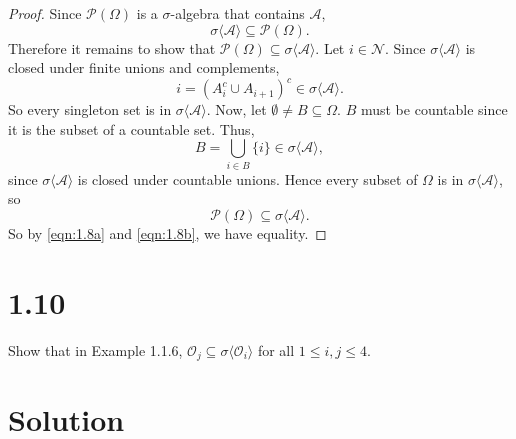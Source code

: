 \documentclass[12pt]{article}
\begin{document}
\begin{proof}
Since $\mathcal{P}(\Omega)$ is a $\sigma$-algebra that contains $\mathcal{A}$, 
\begin{equation}
\sigma\langle \mathcal{A}\rangle \subseteq \mathcal{P}(\Omega).
\label{eqn:1.8a}
\end{equation}
Therefore it remains to show that $\mathcal{P}(\Omega) \subseteq \sigma \langle \mathcal{A} \rangle$. Let $i \in \mathcal{N}$. Since
$\sigma\langle\mathcal{A}\rangle$ is closed under finite unions and complements, 
\[ i = \left( A_{i}^{c} \cup A_{i+1} \right)^{c} \in \sigma\langle\mathcal{A}\rangle. \]
So every singleton set is in $\sigma\langle\mathcal{A}\rangle$.
Now, let $\emptyset \neq B \subseteq \Omega$. $B$ must be countable since it is the subset of a countable set. Thus, 
\[ B = \bigcup_{i\in B}\{i\} \in \sigma\langle\mathcal{A}\rangle, \]
since $\sigma\langle\mathcal{A}\rangle$ is closed under countable unions. Hence every subset of $\Omega$ is in $\sigma\langle\mathcal{A}\rangle$, so
\begin{equation}
\mathcal{P}(\Omega) \subseteq \sigma\langle\mathcal{A}\rangle.
\label{eqn:1.8b}
\end{equation}
So by \ref{eqn:1.8a} and \ref{eqn:1.8b}, we have equality.
\end{proof}

\newpage
\section*{1.10}

Show that in Example 1.1.6, $\mathcal{O}_{j} \subseteq \sigma\langle\mathcal{O}_{i}\rangle$ for all $1 \leq i,j \leq 4$.

\section*{Solution}
\end{document}
